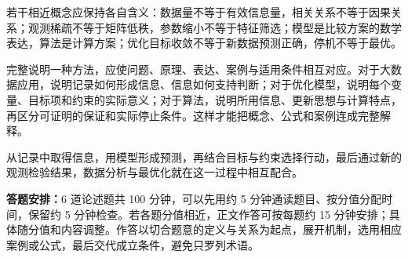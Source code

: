 \documentclass[UTF8,fontset=fandol,a4paper,12pt]{ctexart}
\theoremstyle{definition}
\begin{document}
若干相近概念应保持各自含义：数据量不等于有效信息量，相关关系不等于因果关系；观测稀疏不等于矩阵低秩，参数缩小不等于特征筛选；模型是比较方案的数学表达，算法是计算方案；优化目标收敛不等于新数据预测正确，停机不等于最优。

完整说明一种方法，应使问题、原理、表达、案例与适用条件相互对应。对于大数据应用，说明记录如何形成信息、信息如何支持判断；对于优化模型，说明每个变量、目标项和约束的实际意义；对于算法，说明所用信息、更新思想与计算特点，再区分可证明的保证和实际停止条件。这样才能把概念、公式和案例连成完整解释。

从记录中取得信息，用模型形成预测，再结合目标与约束选择行动，最后通过新的观测检验结果，数据分析与最优化就在这一过程中相互配合。

\smallskip
\noindent\textbf{答题安排：}6 道论述题共 100 分钟，可以先用约 5 分钟通读题目、按分值分配时间，保留约 5 分钟检查。若各题分值相近，正文作答可按每题约 15 分钟安排；具体随分值和内容调整。作答以切合题意的定义与关系为起点，展开机制，选用相应案例或公式，最后交代成立条件，避免只罗列术语。

\clearpage
\appendix
\end{document}
